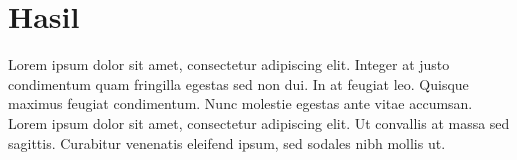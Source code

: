 \chapter{Hasil}

Lorem ipsum dolor sit amet, consectetur adipiscing elit. Integer at justo condimentum quam fringilla egestas sed non dui. In at feugiat leo. Quisque maximus feugiat condimentum. Nunc molestie egestas ante vitae accumsan. Lorem ipsum dolor sit amet, consectetur adipiscing elit. Ut convallis at massa sed sagittis. Curabitur venenatis eleifend ipsum, sed sodales nibh mollis ut.